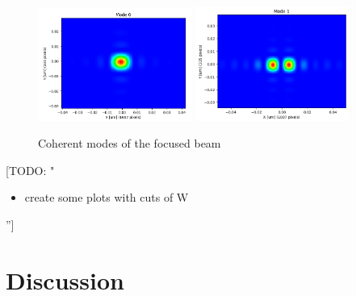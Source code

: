 \documentclass{iucr}              %
\newcommand{\todo}[1]{{\color{red}[TODO: "#1'']}}
\begin{document}
\begin{figure}\label{fig:final modes}
    \centering
        \includegraphics[width=0.45\textwidth]{GRAPHICS/final_mode0.png}
        \includegraphics[width=0.45\textwidth]{GRAPHICS/final_mode1.png}
    \caption{Coherent modes of the focused beam}
\end{figure}


\todo{
\begin{itemize}
 \item create some plots with cuts of W
\end{itemize}
}
 

\section{Discussion} 
\end{document}
